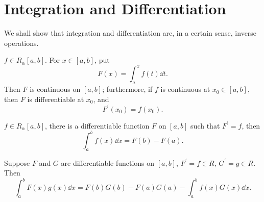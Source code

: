 \section{Integration and Differentiation}
We shall show that integration and differentiation are, in a certain sense, inverse operations.

\begin{lemma}
$f\in R_\alpha[a,b]$. For $x\in [a,b]$, put
\[F(x)=\int_a^x f(t)\dd{t}.\]
Then $F$ is continuous on $[a,b]$; furthermore, if $f$ is continuous at $x_0\in[a,b]$, then $F$ is differentiable at $x_0$, and
\[F^\prime(x_0)=f(x_0).\]
\end{lemma}

\begin{theorem}
$f\in R_\alpha[a,b]$, there is a differentiable function $F$ on $[a,b]$ such that $F^\prime=f$, then
\begin{equation}
\int_a^b f(x)\dd{x}=F(b)-F(a).
\end{equation}
\end{theorem}

\begin{theorem}
Suppose $F$ and $G$ are differentiable functions on $[a,b]$, $F^\prime=f\in R$, $G^\prime=g\in R$. Then
\begin{equation}
\int_a^b F(x)g(x)\dd{x}=F(b)G(b)-F(a)G(a)-\int_a^b f(x)G(x)\dd{x}.
\end{equation}
\end{theorem}